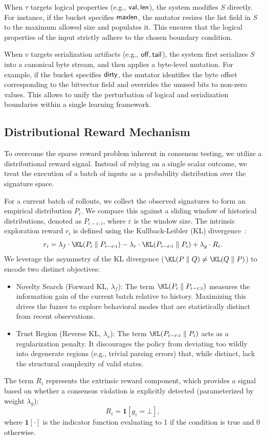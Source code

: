 When $\tau$ targets logical properties (e.g., ${\sf val}, {\sf len}$), the system modifies $S$ directly. For instance, if the bucket specifies ${\sf maxlen}$, the mutator resizes the list field in $S$ to the maximum allowed size and populates it. This ensures that the logical properties of the input strictly adhere to the chosen boundary condition.

When $v$ targets serialization artifacts (e.g., ${\sf off}, {\sf tail}$), the system first serializes $S$ into a canonical byte stream, and then applies a byte-level mutation. For example, if the bucket specifies ${\sf dirty}$, the mutator identifies the byte offset corresponding to the bitvector field and overrides the unused bits to non-zero values. This allows \tool to unify the perturbation of logical and serialization boundaries within a single learning framework.

\subsection{Distributional Reward Mechanism}

To overcome the sparse reward problem inherent in consensus testing, we utilize a distributional reward signal. Instead of relying on a single scalar outcome, we treat the execution of a batch of inputs as a probability distribution over the signature space.

For a current batch of rollouts, we collect the observed signatures to form an empirical distribution $P_i$. We compare this against a sliding window of historical distributions, denoted as $P_{i-\varepsilon:i}$, where $\varepsilon$ is the window size. The intrinsic exploration reward $r_i$ is defined using the Kullback-Leibler (KL) divergence~\cite{kullback1951information}:
\[
    r_i = \lambda_f \cdot \KL(P_i \parallel P_{i-\varepsilon:i}) - \lambda_r \cdot \KL(P_{i-\varepsilon:i} \parallel P_i) + \lambda_g \cdot R_i.
\]
We leverage the asymmetry of the KL divergence ($\KL(P \parallel Q) \neq \KL(Q \parallel P)$) to encode two distinct objectives:
\begin{itemize}
    \item Novelty Search (Forward KL, $\lambda_f$): The term $\KL(P_i \parallel P_{i-\varepsilon:i})$ measures the information gain of the current batch relative to history. Maximizing this drives the fuzzer to explore behavioral modes that are statistically distinct from recent observations.
    \item Trust Region (Reverse KL, $\lambda_r$): The term $\KL(P_{i-\varepsilon:i} \parallel P_i)$ acts as a regularization penalty. It discourages the policy from deviating too wildly into degenerate regions (e.g., trivial parsing errors) that, while distinct, lack the structural complexity of valid states.
\end{itemize}
The term $R_i$ represents the extrinsic reward component, which provides a signal based on whether a consensus violation is explicitly detected (parameterized by weight $\lambda_g$):
\[
    R_i = \mathbf{1}[g_i = \bot],
\]
where $\mathbf{1}[\cdot]$ is the indicator function evaluating to 1 if the condition is true and 0 otherwise.
